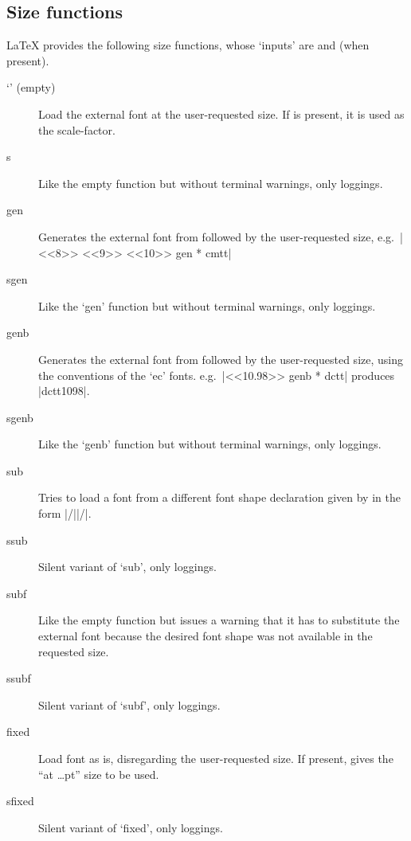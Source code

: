 \documentclass{ltxguide}[1995/11/28]
\begin{document}
 
\subsection{Size functions}
\label{sec:sizefunct}
 
 
\LaTeX{} provides the following size functions, whose `inputs' are
 and  (when present).
 
\begin{description}
\item[`' (empty)]
Load the external font  at the user-requested size. If
 is present, it is used as the scale-factor.
 
\item[s]
Like the empty function but without terminal warnings, only
loggings.
 
\item[gen]
Generates the external font from  followed by
the user-requested size, e.g.~|<<8>> <<9>> <<10>> gen * cmtt|
 
\item[sgen]
Like the `gen' function but without terminal warnings, only loggings.

\item[genb]
Generates the external font from  followed by
the user-requested size, using the conventions of the `ec' fonts.
e.g.~|<<10.98>> genb * dctt| produces |dctt1098|.
 
\item[sgenb]
Like the `genb' function but without terminal warnings, only loggings.
 
\item[sub]
Tries to load a font from a different font shape declaration given by
 in the form |/||/|.
 
\item[ssub]
Silent variant of `sub', only loggings.
 
\item[subf]
Like the empty function but issues a warning that it has to substitute
the external font  because the desired font shape was not
available in the requested size.
 
\item[ssubf]
Silent variant of `subf', only loggings.
 
\item[fixed]
Load font  as is, disregarding the user-requested size.
If present,  gives the ``at \ldots pt'' size to be used.
 
\item[sfixed]
Silent variant of `fixed', only loggings.
 
\end{description}
 
\end{document}
